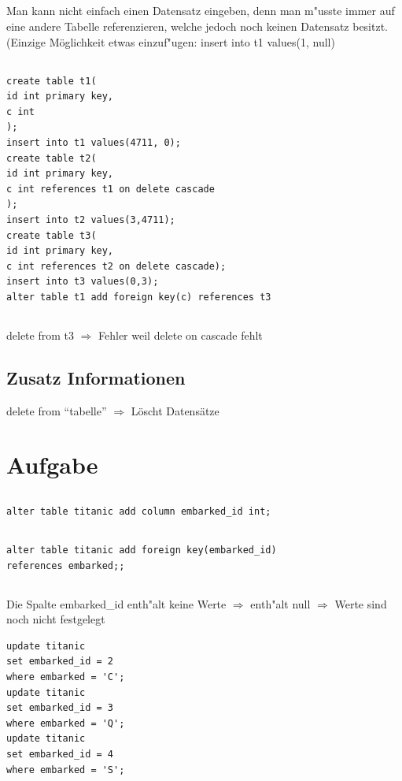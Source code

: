 \documentclass[a4paper, 11pt, titlepage]{article}
\begin{document}
\subsection{}
Man kann nicht einfach einen Datensatz eingeben, denn man m"usste immer auf eine andere Tabelle referenzieren, welche jedoch noch keinen Datensatz besitzt. (Einzige Möglichkeit etwas einzuf"ugen: insert into t1 values(1, null)
\subsection{}
\begin{verbatim}
create table t1(
id int primary key,
c int
);
insert into t1 values(4711, 0);
create table t2(
id int primary key,
c int references t1 on delete cascade
);
insert into t2 values(3,4711);
create table t3(
id int primary key,
c int references t2 on delete cascade);
insert into t3 values(0,3);
alter table t1 add foreign key(c) references t3
\end{verbatim}
\subsection{}
delete from t3 $\Rightarrow$ Fehler weil delete on cascade fehlt
\subsection{Zusatz Informationen}
delete from "`tabelle"' $\Rightarrow$ Löscht Datensätze
\section{Aufgabe}
\subsection{}
\begin{verbatim}
alter table titanic add column embarked_id int;
\end{verbatim}
\subsection{}
\begin{verbatim}
alter table titanic add foreign key(embarked_id) 
references embarked;;
\end{verbatim}
\subsection{}
Die Spalte embarked\_id enth"alt keine Werte $\Rightarrow$ enth"alt null $\Rightarrow$ Werte sind noch nicht festgelegt
\begin{verbatim}
update titanic
set embarked_id = 2
where embarked = 'C';
update titanic
set embarked_id = 3
where embarked = 'Q';
update titanic
set embarked_id = 4
where embarked = 'S';
\end{verbatim}
\end{document}
